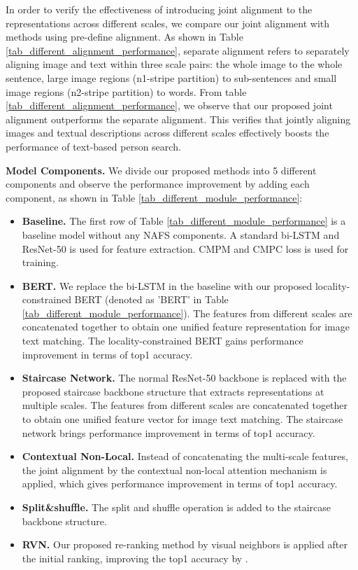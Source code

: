 \documentclass[final]{cvpr}
\begin{document}
In order to verify the effectiveness of introducing joint alignment to the representations across different scales, we compare our joint alignment with methods using pre-define alignment.
As shown in  Table \ref{tab_different_alignment_performance}, separate alignment refers to separately aligning image and text within three scale pairs: the whole image to the whole sentence, large image regions (n1-stripe partition) to sub-sentences and small image regions (n2-stripe partition) to words. 
From table \ref{tab_different_alignment_performance}, we observe that our proposed joint alignment outperforms the separate alignment. This verifies that jointly aligning images and textual descriptions across different scales effectively boosts the performance of text-based person search. 

\textbf{Model Components.} We divide our proposed methods into 5 different components and observe the performance improvement by adding each component, as shown in Table \ref{tab_different_module_performance}: 
\begin{itemize}
\item \textbf{Baseline.} The first row of Table  \ref{tab_different_module_performance} is a baseline model without any NAFS components. A standard bi-LSTM\cite{hochreiter1997long} and ResNet-50 is used for feature extraction. CMPM and CMPC loss is used for training. 
\vspace{-4pt}
\item \textbf{BERT.} We replace the bi-LSTM in the baseline with our proposed locality-constrained BERT (denoted as 'BERT' in Table \ref{tab_different_module_performance}). The features from different scales are concatenated together to obtain one unified feature representation for image text matching. The locality-constrained BERT gains  performance improvement in terms of top1 accuracy.
\vspace{-4pt}
\item \textbf{Staircase Network.} The normal ResNet-50 backbone is replaced with the proposed staircase backbone structure that extracts representations at multiple scales. The features from different scales are concatenated together to obtain one unified feature vector for image text matching. The staircase network brings  performance improvement in terms of top1 accuracy. 
\vspace{-4pt}
\item \textbf{Contextual Non-Local.} Instead of concatenating the multi-scale features, the joint alignment by the contextual non-local attention mechanism is applied, which gives  performance improvement in terms of top1 accuracy.  
\vspace{-4pt}
\item \textbf{Split\&shuffle.} The split and shuffle operation is added to the staircase backbone structure. 
\vspace{-4pt}
\item \textbf{RVN.}  Our proposed re-ranking method by visual neighbors is applied after the initial ranking, improving the top1 accuracy by . 
\end{itemize}
\end{document}
